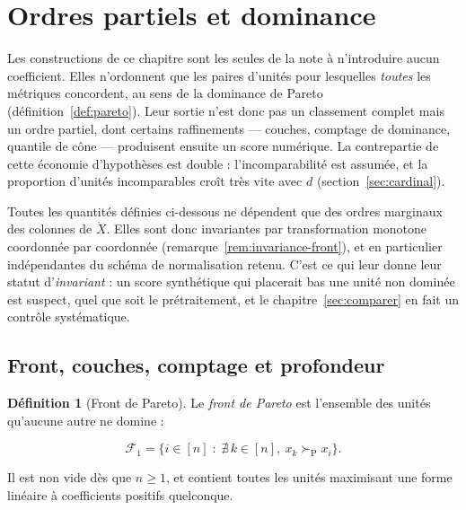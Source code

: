 \documentclass[11pt,a4paper]{article}
\theoremstyle{definition}
\newtheorem{definition}{Définition}[section]
\theoremstyle{remark}
\newcommand{\pareto}{\succ_{\mathrm{P}}}
\newcommand{\Xor}{\mathring{X}}
\begin{document}
\section{Ordres partiels et dominance}
\label{sec:ordres}

\medskip

Les constructions de ce chapitre sont les seules de la note à n'introduire aucun
coefficient. Elles n'ordonnent que les paires d'unités pour lesquelles \emph{toutes} les
métriques concordent, au sens de la dominance de Pareto (définition~\ref{def:pareto}).
Leur sortie n'est donc pas un classement complet mais un ordre partiel, dont certains
raffinements --- couches, comptage de dominance, quantile de cône --- produisent ensuite
un score numérique. La contrepartie de cette économie d'hypothèses est double :
l'incomparabilité est assumée, et la proportion d'unités incomparables croît très vite
avec $d$ (section~\ref{sec:cardinal}).

\bigskip

Toutes les quantités définies ci-dessous ne dépendent que des ordres marginaux des
colonnes de $\Xor$. Elles sont donc invariantes par transformation monotone coordonnée
par coordonnée (remarque~\ref{rem:invariance-front}), et en particulier indépendantes du
schéma de normalisation retenu. C'est ce qui leur donne leur statut d'\emph{invariant} :
un score synthétique qui placerait bas une unité non dominée est suspect, quel que soit
le prétraitement, et le chapitre~\ref{sec:comparer} en fait un contrôle systématique.

\bigskip

\subsection{Front, couches, comptage et profondeur}
\label{sec:front}

\medskip

\begin{definition}[Front de Pareto]
  \label{def:front}
  Le \emph{front de Pareto} est l'ensemble des unités qu'aucune autre ne domine :

  \medskip

  \[
    \mathcal{F}_1 = \big\{ i \in [n] \;:\; \nexists\, k \in [n],\ x_k \pareto x_i \big\}.
  \]

  \bigskip

  Il est non vide dès que $n \ge 1$, et contient toutes les unités maximisant une forme
  linéaire à coefficients positifs quelconque.
\end{definition}
\end{document}
